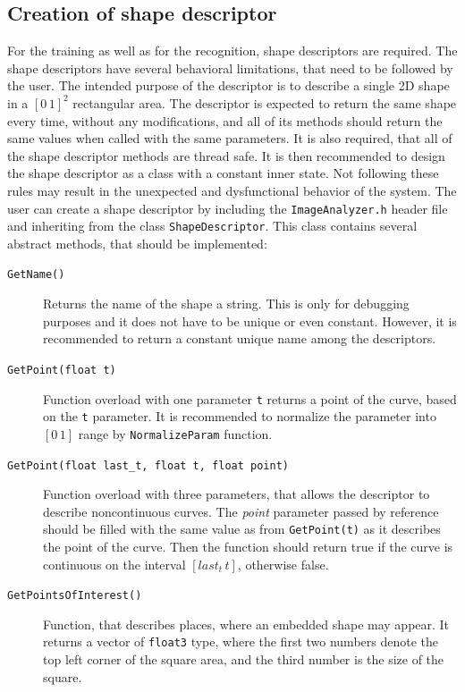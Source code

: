 \subsection{Creation of shape descriptor}
For the training as well as for the recognition, shape descriptors are required. The shape descriptors have several behavioral limitations, that need to be followed by the user. The intended purpose of the descriptor is to describe a single 2D shape in a $[0\,1]^2$ rectangular area. The descriptor is expected to return the same shape every time, without any modifications, and all of its methods should return the same values when called with the same parameters. It is also required, that all of the shape descriptor methods are thread safe. It is then recommended to design the shape descriptor as a class with a constant inner state. Not following these rules may result in the unexpected and dysfunctional behavior of the system. The user can create a shape descriptor by including the \texttt{ImageAnalyzer.h} header file and inheriting from the class \texttt{ShapeDescriptor}. This class contains several abstract methods, that should be implemented:
\begin{description}
\item[\texttt{GetName()}] Returns the name of the shape a string. This is only for debugging purposes and it does not have to be unique or even constant. However, it is recommended to return a constant unique name among the descriptors.

\item[\texttt{GetPoint(\texttt{float} t)}] Function overload with one parameter \texttt{t} returns a point of the curve, based on the \texttt{t} parameter. It is recommended to normalize the parameter into $[0\,1]$ range by \texttt{NormalizeParam} function.

\item[\texttt{GetPoint(float last\_t, float t, float point)}] Function overload with three parameters, that allows the descriptor to describe noncontinuous curves. The \emph{point} parameter passed by reference should be filled with the same value as from \texttt{GetPoint(t)} as it describes the point of the curve. Then the function should return true if the curve is continuous on the interval $[last_t\, t]$, otherwise false.

\item[\texttt{GetPointsOfInterest()}] Function, that describes places, where an embedded shape may appear. It returns a vector of \texttt{float3} type, where the first two numbers denote the top left corner of the square area, and the third number is the size of the square.
\end{description}

